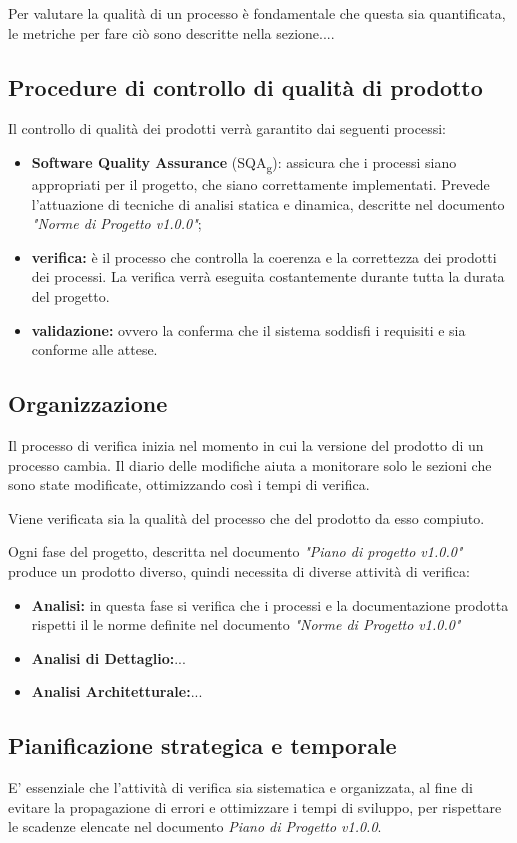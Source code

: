\documentclass[12pt,a4paper,titlepage]{article}
\begin{document}
	Per valutare la qualità di un processo è fondamentale che questa sia quantificata, le metriche per fare ciò sono descritte nella sezione....
	
	\subsection{Procedure di controllo di qualità di prodotto}
	Il controllo di qualità dei prodotti verrà garantito dai seguenti processi:
	\begin{itemize}
		\item \textbf{Software Quality Assurance} (SQA\textsubscript{g}): assicura che i processi siano appropriati per il progetto, che siano correttamente implementati. Prevede l'attuazione di tecniche di analisi statica e dinamica, descritte nel documento \textit{"Norme di Progetto v1.0.0"};
		\item \textbf{verifica:} è il processo che controlla la coerenza e la correttezza dei prodotti dei processi. La verifica verrà eseguita costantemente durante tutta la durata del progetto.
		\item \textbf{validazione:} ovvero la conferma che il sistema soddisfi i requisiti e sia conforme alle attese.
	\end{itemize}

	\subsection{Organizzazione}
	Il processo di verifica inizia nel momento in cui la versione del prodotto di un processo cambia. Il diario delle modifiche aiuta a monitorare solo le sezioni che sono state modificate, ottimizzando così i tempi di verifica. 
	
	Viene verificata sia la qualità del processo che del prodotto da esso compiuto.
	
	Ogni fase del progetto, descritta nel documento \textit{"Piano di progetto v1.0.0"} produce un prodotto diverso, quindi necessita di diverse attività di verifica:
	\begin{itemize}
		\item \textbf{Analisi:} in questa fase si verifica che i processi e la documentazione prodotta rispetti il le norme definite nel documento \textit{"Norme di Progetto v1.0.0"}
		\item \textbf{Analisi di Dettaglio:}...
		\item \textbf{Analisi Architetturale:}...
	\end{itemize}
	\subsection{Pianificazione strategica e temporale}
	E' essenziale che l'attività di verifica sia sistematica e organizzata, al fine di evitare la propagazione di errori e ottimizzare i tempi di sviluppo, per rispettare le scadenze elencate nel documento \textit{Piano di Progetto v1.0.0}.
	
\end{document}
